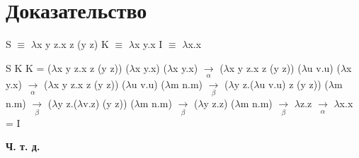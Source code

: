 \documentclass[a4paper,14pt]{article}
\begin{document}
\fontsize{14}{7pt}\selectfont
{} 
\bigskip
\section*{Доказательство}
S $\equiv$ $\lambda$x y z.x z (y z) \newline
K $\equiv$ $\lambda$x y.x \newline
I $\equiv$ $\lambda$x.x \newline
\bigskip

S K K = ($\lambda$x y z.x z (y z)) ($\lambda$x y.x) ($\lambda$x y.x)
        $\xrightarrow[\alpha]{}$ \newline
        ($\lambda$x y z.x z (y z)) ($\lambda$u v.u) ($\lambda$x y.x) 
        $\xrightarrow[\alpha]{}$ \newline
        ($\lambda$x y z.x z (y z)) ($\lambda$u v.u) ($\lambda$m n.m) 
        $\xrightarrow[\beta]{}$ \newline
        ($\lambda$y z.($\lambda$u v.u) z (y z)) ($\lambda$m n.m) 
        $\xrightarrow[\beta]{}$ \newline
        ($\lambda$y z.($\lambda$v.z) (y z)) ($\lambda$m n.m) 
        $\xrightarrow[\beta]{}$ \newline
        ($\lambda$y z.z) ($\lambda$m n.m) 
        $\xrightarrow[\beta]{}$ \newline
        $\lambda$z.z 
        $\xrightarrow[\alpha]{}$ \newline
        $\lambda$x.x = I
        
\bigskip
\textbf{Ч. т. д.}
        
\end{document}
